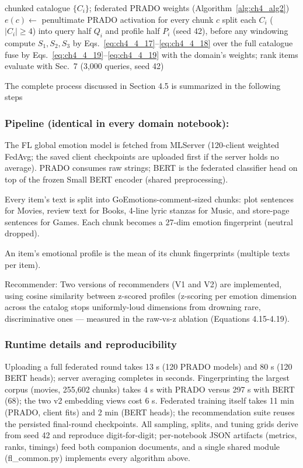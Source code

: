 \begin{algorithm}[htbp]
\caption{PRADO FL v2: federated embeddings, split-half document queries, three-view ensemble.}
\label{alg:ch4_alg4}
\begin{algorithmic}[1]
\Require chunked catalogue $\{C_i\}$; federated PRADO weights (Algorithm~\ref{alg:ch4_alg2})
\State $e(c) \leftarrow$ penultimate PRADO activation for every chunk $c$
\State split each $C_i$ ($|C_i| \geq 4$) into query half $Q_i$ and profile half $P_i$ (seed 42), before any windowing
\State compute $S_1, S_2, S_3$ by Eqs.~\ref{eq:ch4_4_17}--\ref{eq:ch4_4_18} over the full catalogue
\State fuse by Eqs.~\ref{eq:ch4_4_19}--\ref{eq:ch4_4_19} with the domain's weights; rank items
\State evaluate with Sec.~7 (3,000 queries, seed 42)
\end{algorithmic}
\end{algorithm}

The complete process discussed in Section 4.5 is summarized in the following steps

\subsubsection{Pipeline (identical in every domain notebook):}
The FL global emotion model is fetched from MLServer (120-client weighted FedAvg; the saved client checkpoints are uploaded first if the server holds no average). PRADO consumes raw strings; BERT is the federated classifier head on top of the frozen Small BERT encoder (shared preprocessing).

Every item's text is split into GoEmotions-comment-sized chunks: plot sentences for Movies, review text for Books, 4-line lyric stanzas for Music, and store-page sentences for Games. Each chunk becomes a 27-dim emotion fingerprint (neutral dropped).

An item's emotional profile is the mean of its chunk fingerprints (multiple texts per item).

Recommender: Two versions of recommenders (V1 and V2) are implemented, using cosine similarity between z-scored profiles (z-scoring per emotion dimension across the catalog stops uniformly-loud dimensions from drowning rare, discriminative ones --- measured in the raw-vs-z ablation (Equations 4.15-4.19).

\subsubsection{Runtime details and reproducibility}
Uploading a full federated round takes 13 s (120 PRADO models) and 80 s (120 BERT heads); server averaging completes in seconds. Fingerprinting the largest corpus (movies, 255,602 chunks) takes 4 s with PRADO versus 297 s with BERT (68); the two v2 embedding views cost 6 s. Federated training itself takes 11 min (PRADO,  client fits) and 2 min (BERT heads); the recommendation suite reuses the persisted final-round checkpoints. All sampling, splits, and tuning grids derive from seed 42 and reproduce digit-for-digit; per-notebook JSON artifacts (metrics, ranks, timings) feed both companion documents, and a single shared module (fl\_common.py) implements every algorithm above.

